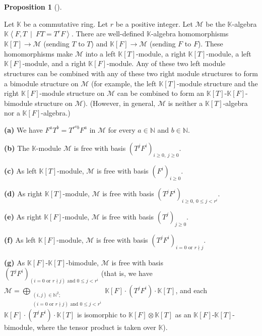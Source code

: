 \documentclass[numbers=enddot,12pt,final,onecolumn,notitlepage]{scrartcl}%
\theoremstyle{definition}
\newtheorem{prop}[theo]{Proposition}
\newenvironment{proposition}[1][]
{\begin{prop}[#1]\begin{leftbar}}
{\end{leftbar}\end{prop}}
\begin{document}
\begin{proposition}
\label{prop.F-gen.bases}Let $\mathbb{K}$ be a commutative ring. Let $r$ be a
positive integer. Let $\mathcal{M}$ be the $\mathbb{K}$-algebra $\mathbb{K}%
\left\langle F,T\ \mid\ FT=T^{r}F\right\rangle $. There are well-defined
$\mathbb{K}$-algebra homomorphisms $\mathbb{K}\left[  T\right]  \rightarrow
\mathcal{M}$ (sending $T$ to $T$) and $\mathbb{K}\left[  F\right]
\rightarrow\mathcal{M}$ (sending $F$ to $F$). These homomorphisms make
$\mathcal{M}$ into a left $\mathbb{K}\left[  T\right]  $-module, a right
$\mathbb{K}\left[  T\right]  $-module, a left $\mathbb{K}\left[  F\right]
$-module, and a right $\mathbb{K}\left[  F\right]  $-module. Any of these two
left module structures can be combined with any of these two right module
structures to form a bimodule structure on $\mathcal{M}$ (for example, the
left $\mathbb{K}\left[  T\right]  $-module structure and the right
$\mathbb{K}\left[  F\right]  $-module structure on $\mathcal{M}$ can be
combined to form an $\mathbb{K}\left[  T\right]  $-$\mathbb{K}\left[
F\right]  $-bimodule structure on $\mathcal{M}$). (However, in general,
$\mathcal{M}$ is neither a $\mathbb{K}\left[  T\right]  $-algebra nor a
$\mathbb{K}\left[  F\right]  $-algebra.)

\textbf{(a)} We have $F^{a}T^{b}=T^{r^{a}b}F^{a}$ in $\mathcal{M}$ for every
$a\in\mathbb{N}$ and $b\in\mathbb{N}$.

\textbf{(b)} The $\mathbb{K}$-module $\mathcal{M}$ is free with basis $\left(
T^{j}F^{i}\right)  _{i\geq0,\ j\geq0}$.

\textbf{(c)} As left $\mathbb{K}\left[  T\right]  $-module, $\mathcal{M}$ is
free with basis $\left(  F^{i}\right)  _{i\geq0}$.

\textbf{(d)} As right $\mathbb{K}\left[  T\right]  $-module, $\mathcal{M}$ is
free with basis $\left(  T^{j}F^{i}\right)  _{i\geq0,\ 0\leq j<r^{i}}$.

\textbf{(e)} As right $\mathbb{K}\left[  F\right]  $-module, $\mathcal{M}$ is
free with basis $\left(  T^{j}\right)  _{j\geq0}$.

\textbf{(f)} As left $\mathbb{K}\left[  F\right]  $-module, $\mathcal{M}$ is
free with basis $\left(  T^{j}F^{i}\right)  _{i=0\text{ or }r\nmid j}$.

\textbf{(g)} As $\mathbb{K}\left[  F\right]  $-$\mathbb{K}\left[  T\right]
$-bimodule, $\mathcal{M}$ is free with basis $\left(  T^{j}F^{i}\right)
_{\left(  i=0\text{ or }r\nmid j\right)  \text{ and }0\leq j<r^{i}}$ (that is,
we have $\mathcal{M}=\bigoplus\limits_{\substack{\left(  i,j\right)
\in\mathbb{N}^{2};\\\left(  i=0\text{ or }r\nmid j\right)  \text{ and }0\leq
j<r^{i}}}\mathbb{K}\left[  F\right]  \cdot\left(  T^{j}F^{i}\right)
\cdot\mathbb{K}\left[  T\right]  $, and each $\mathbb{K}\left[  F\right]
\cdot\left(  T^{j}F^{i}\right)  \cdot\mathbb{K}\left[  T\right]  $ is
isomorphic to $\mathbb{K}\left[  F\right]  \otimes\mathbb{K}\left[  T\right]
$ as an $\mathbb{K}\left[  F\right]  $-$\mathbb{K}\left[  T\right]
$-bimodule, where the tensor product is taken over $\mathbb{K}$).
\end{proposition}
\end{document}
